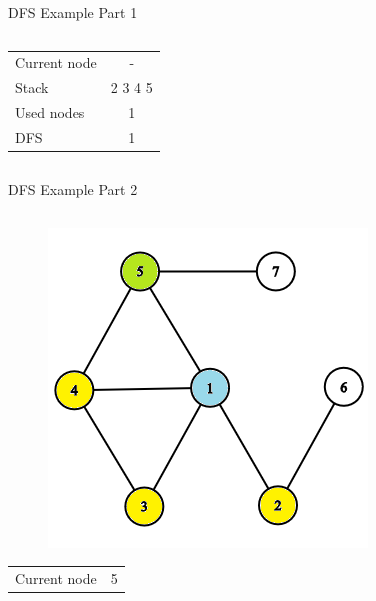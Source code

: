 \documentclass[aspectratio=169]{beamer}%
\begin{document}
\begin{frame}{DFS Example Part 1}
\begin{columns}
\begin{column}{0.32\textwidth}
\begin{figure}[!ht]
            \end{figure}
            \begin{table}[ht]
                \centering
                \begin{tabular}{l c}
                    Current node & -\\
                    Stack & 2 3 4 5\\ 
                    Used nodes & 1\\
                    DFS & 1
                \end{tabular}
            \end{table}
        \end{column}
    \end{columns}
\end{frame}

\begin{frame}{DFS Example Part 2}
    \begin{columns}
        \begin{column}{0.32\textwidth}
            \begin{figure}[!ht]
                \centering
                \includegraphics[width=0.9\linewidth]{dfs 4.png}
            \end{figure}
            \begin{table}[ht]
                \centering
                \begin{tabular}{l c}
                    Current node & 5\\

\end{tabular}
\end{table}
\end{column}
\end{columns}
\end{frame}
\end{document}
